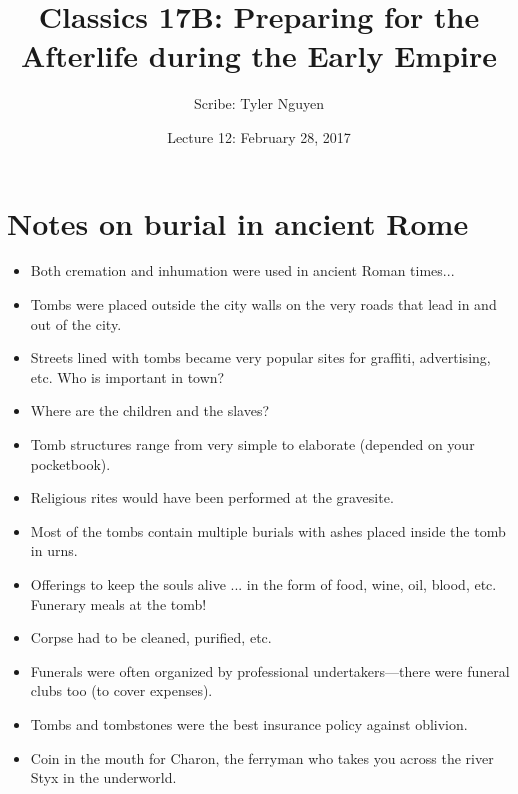 \documentclass{article}
\begin{document}
\title{Classics 17B: Preparing for the Afterlife during the Early Empire}
\author{Scribe: Tyler Nguyen}
\date{Lecture 12: February 28, 2017}
\maketitle
\section{Notes on burial in ancient Rome}
\begin{itemize}
\item Both cremation and inhumation were used in ancient Roman times...
\item Tombs were placed outside the city walls on the very roads that lead in and out of the city.
\item Streets lined with tombs became very popular sites for graffiti, advertising, etc.  Who is important in town?
\item Where are the children and the slaves?
\item Tomb structures range from very simple to elaborate (depended on your pocketbook).
\item Religious rites would have been performed at the gravesite.
\item Most of the tombs contain multiple burials with ashes placed inside the tomb in urns.
\item Offerings to keep the souls alive ... in the form of food, wine, oil, blood, etc.  Funerary meals at the tomb!
\item Corpse had to be cleaned, purified, etc.
\item Funerals were often organized by professional undertakers---there were funeral clubs too (to cover expenses).
\item Tombs and tombstones were the best insurance policy against oblivion.
\item Coin in the mouth for Charon, the ferryman who takes you across the river Styx in the underworld.
\end{itemize}
\end{document}
